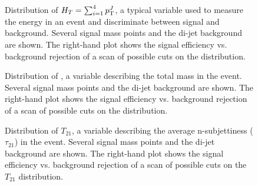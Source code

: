 
\begin{figure}
\centering
{}
\label{fig:search:search:optimization:HT}
\caption{Distribution of $H_T = \sum_{i=1}^4 p_{\text{T}}^J$, a typical variable used to measure the energy in an event and discriminate between signal and background. Several signal mass points and the \herwigpp di-jet background are shown. The right-hand plot shows the signal efficiency vs. background rejection of a scan of possible cuts on the \HT distribution.}
\end{figure}




\begin{figure}
\centering
{}
\label{fig:search:search:optimization:MJ}
\caption{Distribution of \MJ, a variable describing the total mass in the event. Several signal mass points and the \herwigpp di-jet background are shown. The right-hand plot shows the signal efficiency vs. background rejection of a scan of possible cuts on the \MJ distribution.}
\end{figure}




\begin{figure}
\centering
{}
\label{fig:search:search:optimization:T21}
\caption{Distribution of $T_{21}$, a variable describing the average n-subjettiness ($\tau_{21}$) in the event. Several signal mass points and the \herwigpp di-jet background are shown. The right-hand plot shows the signal efficiency vs. background rejection of a scan of possible cuts on the $T_{21}$ distribution.}
\end{figure}


